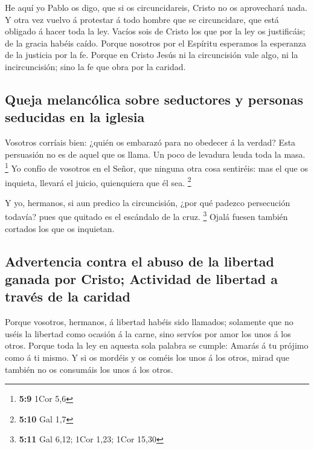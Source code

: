  He aquí yo Pablo os digo, que si os circuncidareis,
Cristo no os aprovechará nada.  Y otra vez vuelvo á
protestar á todo hombre que se circuncidare, que está obligado á hacer
toda la ley.  Vacíos sois de Cristo los que por la ley os
justificáis; de la gracia habéis caído.  Porque nosotros
por el Espíritu esperamos la esperanza de la justicia por la fe.
 Porque en Cristo Jesús ni la circuncisión vale algo, ni
la incircuncisión; sino la fe que obra por la caridad.

\hypertarget{queja-melancuxf3lica-sobre-seductores-y-personas-seducidas-en-la-iglesia}{%
\subsection{Queja melancólica sobre seductores y personas seducidas en
la
iglesia}\label{queja-melancuxf3lica-sobre-seductores-y-personas-seducidas-en-la-iglesia}}

 Vosotros corríais bien: ¿quién os embarazó para no
obedecer á la verdad?  Esta persuasión no es de aquel que
os llama.  Un poco de levadura leuda toda la masa.
\footnote{\textbf{5:9} 1Cor 5,6}  Yo confío de vosotros
en el Señor, que ninguna otra cosa sentiréis: mas el que os inquieta,
llevará el juicio, quienquiera que él sea. \footnote{\textbf{5:10} Gal
  1,7}

 Y yo, hermanos, si aun predico la circuncisión, ¿por qué
padezco persecución todavía? pues que quitado es el escándalo de la
cruz. \footnote{\textbf{5:11} Gal 6,12; 1Cor 1,23; 1Cor 15,30}
 Ojalá fuesen también cortados los que os inquietan.

\hypertarget{advertencia-contra-el-abuso-de-la-libertad-ganada-por-cristo-actividad-de-libertad-a-travuxe9s-de-la-caridad}{%
\subsection{Advertencia contra el abuso de la libertad ganada por
Cristo; Actividad de libertad a través de la
caridad}\label{advertencia-contra-el-abuso-de-la-libertad-ganada-por-cristo-actividad-de-libertad-a-travuxe9s-de-la-caridad}}

 Porque vosotros, hermanos, á libertad habéis sido
llamados; solamente que no uséis la libertad como ocasión á la carne,
sino servíos por amor los unos á los otros.  Porque toda
la ley en aquesta sola palabra se cumple: Amarás á tu prójimo como á ti
mismo.  Y si os mordéis y os coméis los unos á los otros,
mirad que también no os consumáis los unos á los otros.

